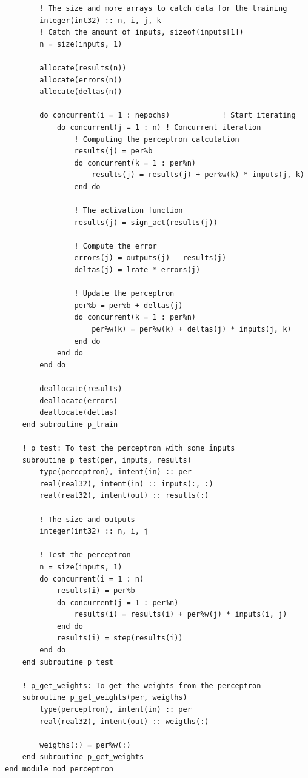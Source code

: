 \documentclass[12pt]{article}
\begin{document}
\begin{lstlisting}
        ! The size and more arrays to catch data for the training
        integer(int32) :: n, i, j, k
        ! Catch the amount of inputs, sizeof(inputs[1])
        n = size(inputs, 1)     

        allocate(results(n))
        allocate(errors(n))
        allocate(deltas(n))
        
        do concurrent(i = 1 : nepochs)            ! Start iterating
            do concurrent(j = 1 : n) ! Concurrent iteration
                ! Computing the perceptron calculation
                results(j) = per%b
                do concurrent(k = 1 : per%n)
                    results(j) = results(j) + per%w(k) * inputs(j, k)
                end do
                
                ! The activation function
                results(j) = sign_act(results(j))

                ! Compute the error 
                errors(j) = outputs(j) - results(j)
                deltas(j) = lrate * errors(j)

                ! Update the perceptron
                per%b = per%b + deltas(j)
                do concurrent(k = 1 : per%n)
                    per%w(k) = per%w(k) + deltas(j) * inputs(j, k)
                end do
            end do
        end do

        deallocate(results)
        deallocate(errors)
        deallocate(deltas)
    end subroutine p_train

    ! p_test: To test the perceptron with some inputs
    subroutine p_test(per, inputs, results)
        type(perceptron), intent(in) :: per
        real(real32), intent(in) :: inputs(:, :)
        real(real32), intent(out) :: results(:)

        ! The size and outputs
        integer(int32) :: n, i, j
        
        ! Test the perceptron
        n = size(inputs, 1)
        do concurrent(i = 1 : n)
            results(i) = per%b
            do concurrent(j = 1 : per%n)
                results(i) = results(i) + per%w(j) * inputs(i, j)
            end do
            results(i) = step(results(i))
        end do
    end subroutine p_test

    ! p_get_weights: To get the weights from the perceptron
    subroutine p_get_weights(per, weigths)
        type(perceptron), intent(in) :: per
        real(real32), intent(out) :: weigths(:)
        
        weigths(:) = per%w(:)
    end subroutine p_get_weights
end module mod_perceptron
\end{lstlisting}
\end{document}
